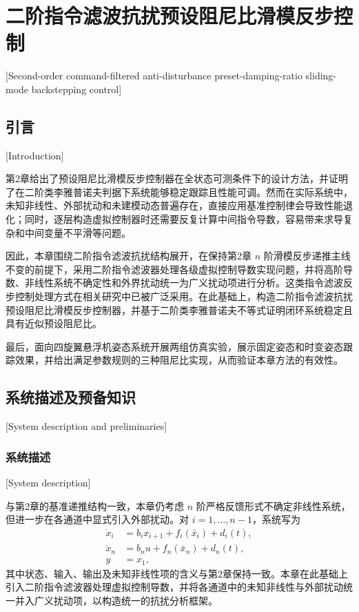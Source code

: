 
\chapter{二阶指令滤波抗扰预设阻尼比滑模反步控制}[Second-order command-filtered anti-disturbance preset-damping-ratio sliding-mode backstepping control]

\section{引言}[Introduction]

第2章给出了预设阻尼比滑模反步控制器在全状态可测条件下的设计方法，并证明了在二阶类李雅普诺夫判据下系统能够稳定跟踪且性能可调。然而在实际系统中，未知非线性、外部扰动和未建模动态普遍存在，直接应用基准控制律会导致性能退化；同时，逐层构造虚拟控制器时还需要反复计算中间指令导数，容易带来求导复杂和中间变量不平滑等问题。

因此，本章围绕二阶指令滤波抗扰结构展开，在保持第2章 $n$ 阶滑模反步递推主线不变的前提下，采用二阶指令滤波器处理各级虚拟控制导数实现问题，并将高阶导数、非线性系统不确定性和外界扰动统一为广义扰动项进行分析。这类指令滤波反步控制处理方式在相关研究中已被广泛采用\cite{ref74}。在此基础上，构造二阶指令滤波抗扰预设阻尼比滑模反步控制器，并基于二阶类李雅普诺夫不等式证明闭环系统稳定且具有近似预设阻尼比。

最后，面向四旋翼悬浮机姿态系统开展两组仿真实验，展示固定姿态和时变姿态跟踪效果，并给出满足参数规则的三种阻尼比实现，从而验证本章方法的有效性。

\section{系统描述及预备知识}[System description and preliminaries]

\subsection{系统描述}[System description]

与第2章的基准递推结构一致，本章仍考虑 $n$ 阶严格反馈形式不确定非线性系统，但进一步在各通道中显式引入外部扰动。对 $i=1,\ldots,n-1$，系统写为
\begin{subequations}\label{eq:ch3_sys_dist}
\begin{align}
\dot x_i &= b_i x_{i+1}+f_i(\bar x_i)+d_i(t),\\
\dot x_n &= b_nu+f_n(\bar x_n)+d_n(t),\\
y &= x_1,
\end{align}
\end{subequations}
其中状态、输入、输出及未知非线性项的含义与第2章保持一致。本章在此基础上引入二阶指令滤波器处理虚拟控制导数，并将各通道中的未知非线性与外部扰动统一并入广义扰动项，以构造统一的抗扰分析框架。

